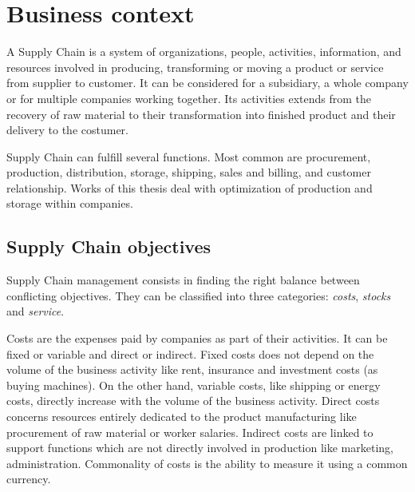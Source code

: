 \chapter{Business context}
\label{chap:business-context}


A Supply Chain is a system of organizations, people, activities, information, and resources involved in producing, transforming or moving a product or service from supplier to customer.
It can be considered for a subsidiary, a whole company or for multiple companies working together.
Its activities extends from the recovery of raw material to their transformation into finished product and their delivery to the costumer.

Supply Chain can fulfill several functions.
Most common are procurement, production, distribution, storage, shipping, sales and billing, and customer relationship.
Works of this thesis deal with optimization of production and storage within companies.


\section{Supply Chain objectives}
\label{sec:business-context:supply-chain-objectives}


Supply Chain management consists in finding the right balance between conflicting objectives.
They can be classified into three categories: \emph{costs}, \emph{stocks} and \emph{service}.


Costs are the expenses paid by companies as part of their activities.
It can be fixed or variable and direct or indirect.
Fixed costs does not depend on the volume of the business activity like rent, insurance and investment costs (as buying machines).
On the other hand, variable costs, like shipping or energy costs, directly increase with the volume of the business activity.
Direct costs concerns resources entirely dedicated to the product manufacturing like procurement of raw material or worker salaries.
Indirect costs are linked to support functions which are not directly involved in production like marketing, administration.
Commonality of costs is the ability to measure it using a common currency.


